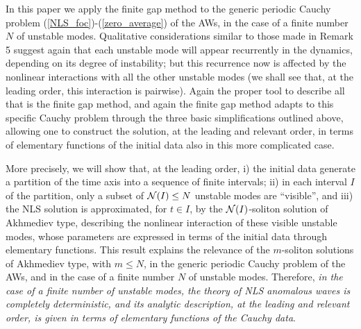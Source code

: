 \documentclass[12pt]{article}
\begin{document}
In this paper we apply the finite gap method to the generic periodic Cauchy problem (\ref{NLS_foc})-(\ref{zero_average}) of the AWs, in the case of a finite number $N$ of unstable modes. Qualitative considerations similar to those made in Remark 5 suggest again that each unstable mode will appear recurrently in the dynamics, depending on its degree of instability; but this recurrence now is affected by the nonlinear interactions with all the other unstable modes (we shall see that, at the leading order, this interaction is pairwise). Again the proper tool to describe all that is the finite gap method, and again the finite gap method adapts to this specific Cauchy problem through the three basic simplifications outlined above, allowing one to construct the solution, at the leading and relevant order, in terms of elementary functions of the initial data also in this more complicated case.

More precisely, we will show that, at the leading order, i) the initial data generate a partition of the time axis into a sequence of finite intervals; ii) in each interval $I$ of the partition, only a subset of ${\cal N}(I)\le N$ unstable modes are ``visible'', and iii) the NLS solution is approximated, for $t\in I$, by the ${\cal N}(I)$-soliton solution of Akhmediev type, describing the nonlinear interaction of these visible unstable modes, whose parameters are expressed in terms of the initial data through elementary functions. This result explains the relevance of the $m$-soliton solutions of Akhmediev type, with $m\le N$, in the generic periodic Cauchy problem of the AWs, and in the case of a finite number $N$ of unstable modes. Therefore, {\it in the case of a finite number of unstable modes, the theory of NLS anomalous waves is completely deterministic, and its analytic description, at the leading and relevant order, is given in terms of elementary functions of the Cauchy data}.
\end{document}
